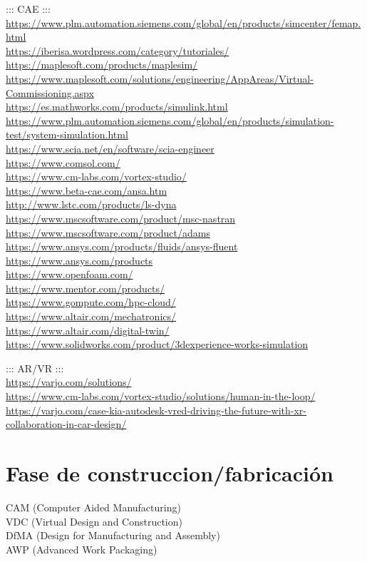 \documentclass[spanish,12pt,a4paper,final,oneside]{book}
\begin{document}
::: CAE :::
\\ \url{https://www.plm.automation.siemens.com/global/en/products/simcenter/femap.html}
\\ \url{https://iberisa.wordpress.com/category/tutoriales/}
\\ \url{https://maplesoft.com/products/maplesim/}
\\ \url{https://www.maplesoft.com/solutions/engineering/AppAreas/Virtual-Commissioning.aspx}
\\ \url{https://es.mathworks.com/products/simulink.html}
\\ {\footnotesize \url{https://www.plm.automation.siemens.com/global/en/products/simulation-test/system-simulation.html}}
\\ \url{https://www.scia.net/en/software/scia-engineer}
\\ \url{https://www.comsol.com/}
\\ \url{https://www.cm-labs.com/vortex-studio/}
\\ \url{https://www.beta-cae.com/ansa.htm}
\\ \url{http://www.lstc.com/products/ls-dyna}
\\ \url{https://www.mscsoftware.com/product/msc-nastran}
\\ \url{https://www.mscsoftware.com/product/adams}
\\ \url{https://www.ansys.com/products/fluids/ansys-fluent}
\\ \url{https://www.ansys.com/products}
\\ \url{https://www.openfoam.com/}
\\ \url{https://www.mentor.com/products/}
\\ \url{https://www.gompute.com/hpc-cloud/}
\\ \url{https://www.altair.com/mechatronics/}
\\ \url{https://www.altair.com/digital-twin/}
\\ \url{https://www.solidworks.com/product/3dexperience-works-simulation}

::: AR/VR :::
\\ \url{https://varjo.com/solutions/}
\\ \url{https://www.cm-labs.com/vortex-studio/solutions/human-in-the-loop/}
\\ \url{https://varjo.com/case-kia-autodesk-vred-driving-the-future-with-xr-collaboration-in-car-design/}

\section{Fase de construccion/fabricación}\label{fabricacion_de_producto}
CAM (Computer Aided Manufacturing)
\\VDC (Virtual Design and Construction)
\\DfMA (Design for Manufacturing and Assembly)
\\AWP (Advanced Work Packaging)
\end{document}
